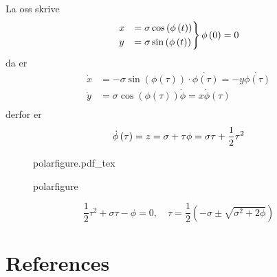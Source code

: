 \documentclass{article}
\newcommand{\incfig}[2][1]{%
\def\svgwidth{#1\columnwidth}
{#2.pdf_tex} } \pdfsuppresswarningpagegroup=1
\theoremstyle{remark}
\newcommand{\newpara}
  {
  \vskip 0.4cm
  }
\begin{document}
  \newpara
  La oss skrive \[
  \begin{split}
    \begin{rcases}
    x &= \sigma  \cos \left( \phi \left( t \right) \right) \\
    y &=  \sigma \sin \left( \phi \left( t \right) \right) \\
    \end{rcases}
    \phi \left( 0 \right) = 0
  \end{split} 
  \] 
  da er \[
  \begin{split}
    \dot{x} &=  -\sigma \sin \left( \phi \left( \tau  \right) \right) \cdot \dot{\phi \left( \tau  \right)} = -y \dot{\phi \left( \tau  \right)} \\
    \dot{y} &= \sigma  \cos \left( \phi \left( \tau  \right) \right) \dot{\phi } = x \dot{\phi }\left( \tau  \right) \\
  \end{split} 
  \] 
  derfor er \[
    \dot{\phi } \left( \tau  \right) =  z = \sigma + \tau \\
    \phi = \sigma \tau  + \frac{1}{2} \tau ^2
  \] 

\begin{figure}[ht]
    \centering
    \incfig{polarfigure}
    \caption{polarfigure}
    \label{fig:polarfigure}
\end{figure}

   \[
   \frac{1}{2} \tau ^2 +  \sigma  \tau  - \phi = 0, \quad \tau = \frac{1}{2} \left( -\sigma \pm\sqrt{\sigma ^2 + 2\phi }  \right) 
   \] 





 \newpage

\section{References}%
\label{sec:references}





\end{document}
